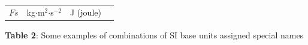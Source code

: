 {\begin{center}
\begin{xtabular*}{\mytablewidth}[t]{|p{10\mystarwidth}|p{10\mystarwidth}|p{10\mystarwidth}|p{10\mystarwidth}|}
                \begin{math}Fs\end{math}
               &
    
    
        kg\begin{math}\ensuremath{\cdot}\end{math}m\begin{math}{}^{2}\end{math}\begin{math}\ensuremath{\cdot}\end{math}s\begin{math}{}^{-2}\end{math} &
    
    
        J (joule)%
     \tabularnewline{}
    \end{xtabular*}
      \end{center}
    \begin{center}{\small\bfseries Table 2}: Some examples of combinations of SI base units assigned
special names\end{center}
    
    \addtocounter{footnote}{-0}
    
        }%
      
    \par
  
